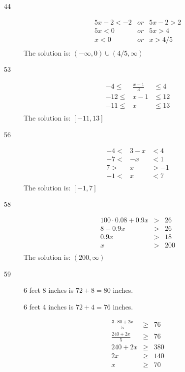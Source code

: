 \documentclass[letterpaper]{exam}
\begin{document}
\begin{description}
      \item[44]
      \begin{align*}
        5x - 2 < -2 &or& 5x - 2 > 2 \\
        5x < 0 &or& 5x > 4 \\
        x < 0 &or& x > 4/5 \\
      \end{align*}
      The solution is: \( (-\infty, 0) \cup (4/5, \infty) \)

      \item[53]
      \begin{align*}
        -4 \leq & \frac{x - 1}{3} & \leq 4 \\
        -12 \leq & x - 1 & \leq 12 \\
        -11 \leq & x & \leq 13 \\
      \end{align*}
      The solution is: \( [-11, 13] \)

      \item[56]
      \begin{align*}
        -4 < & 3 - x & < 4 \\
        -7 < & -x & < 1 \\
        7 >  & x & > -1 \\
        -1 < & x & < 7 \\
      \end{align*}
      The solution is: \( [-1, 7] \)

      \item[58]
      \begin{align*}
        100 \cdot 0.08 + 0.9x &>& 26 \\
        8 + 0.9x &>& 26 \\
        0.9x &>& 18 \\
        x &>& 200 \\
      \end{align*}
      The solution is: \( (200, \infty) \)

      \item[59]

      6 feet 8 inches is $72 + 8 = 80$ inches.

      6 feet 4 inches is $72 + 4 = 76$ inches.

      \begin{align*}
        \frac{3 \cdot 80 + 2x}{5} &\geq& 76 \\
        \frac{240 + 2x}{5} &\geq& 76 \\
        240 + 2x &\geq& 380 \\
        2x &\geq& 140 \\
        x &\geq& 70 \\
      \end{align*}


\end{description}
\end{document}
